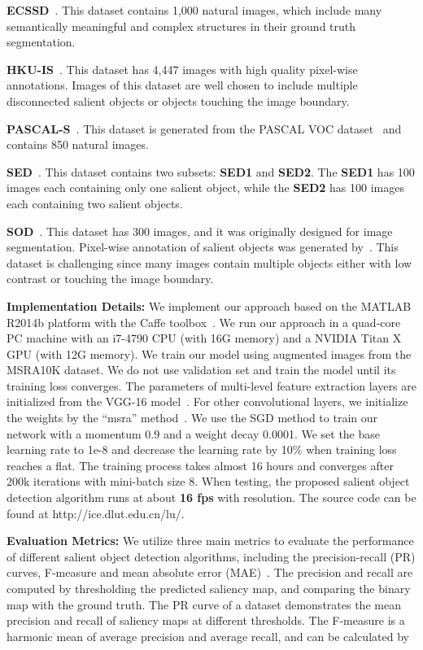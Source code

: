 \documentclass[10pt,twocolumn,letterpaper]{article}
\begin{document}
\textbf{ECSSD}~\cite{yan2013hierarchical}. This dataset contains 1,000 natural images, which include many semantically meaningful and complex structures in their ground truth segmentation.

\textbf{HKU-IS}~\cite{zhao2015saliency}. This dataset has 4,447 images with high quality pixel-wise annotations.
Images of this dataset are well chosen to include multiple disconnected salient objects or objects touching the image boundary.

\textbf{PASCAL-S}~\cite{li2014secrets}. This dataset is generated from the PASCAL VOC dataset~\cite{Everingham2010ThePV} and contains 850 natural images.

\textbf{SED}~\cite{borj2015salient}. This dataset contains two subsets: \textbf{SED1} and \textbf{SED2}.
The \textbf{SED1} has 100 images each containing only one salient object, while the \textbf{SED2} has 100 images each containing two salient objects.

\textbf{SOD}~\cite{yan2013hierarchical}. This dataset has 300 images, and it was originally designed for image segmentation.
Pixel-wise annotation of salient objects was generated by~\cite{jiang2013salient}.
This dataset is challenging since many images contain multiple objects either with low contrast or touching the image boundary.

\textbf{Implementation Details:}
We implement our approach based on the MATLAB R2014b platform with the Caffe toolbox~\cite{jia2014caffe}.
We run our approach in a quad-core PC machine with an i7-4790 CPU (with 16G memory) and a NVIDIA Titan X GPU (with 12G memory).
We train our model using augmented images from the MSRA10K dataset. We do not use validation set and train the model
until its training loss converges.
The parameters of multi-level feature extraction layers are initialized from the VGG-16 model~\cite{simonyan2014very}.
For other convolutional layers, we initialize the weights by the ``msra'' method~\cite{He2015Delving}.
We use the SGD method to train our network with a momentum 0.9 and a weight decay 0.0001.
We set the base learning rate to 1e-8 and decrease the learning rate by 10\% when training loss reaches a flat.
The training process takes almost 16 hours and converges after 200k iterations with mini-batch size 8.
When testing, the proposed salient object detection algorithm runs at about \textbf{16 fps} with  resolution.
The source code can be found at \textcolor[rgb]{1,0,0}{http://ice.dlut.edu.cn/lu/}.

\textbf{Evaluation Metrics:}
We utilize three main metrics to evaluate the performance of different salient object detection algorithms, including the precision-recall (PR) curves, F-measure and mean absolute error (MAE)~\cite{borji2015salient}.
The precision and recall are computed by thresholding the predicted saliency map, and comparing the binary map with the ground truth.
The PR curve of a dataset demonstrates the mean precision and recall of saliency maps at different thresholds.
The F-measure is a harmonic mean of average precision and average recall, and can be calculated by
\vspace{-0.5mm}
\end{document}
